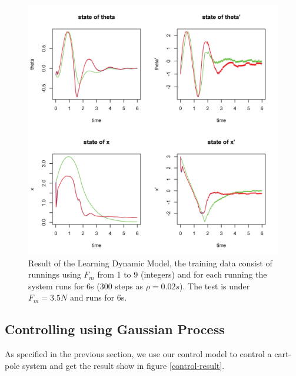 \documentclass[11pt,twoside,a4paper]{article}
\begin{document}
\begin{figure}[!]
\centering
\includegraphics[width=14cm]{learning-result3.png}
\caption{Result of the Learning Dynamic Model, the training data
  consist of runnings using $F_m$ from 1 to 9 (integers) and for each
  running the system runs for 6s (300 steps as $\rho = 0.02s$). The
  test is under $F_m = 3.5N$ and runs for 6s.}
\label{learning-result3}
\end{figure}


\subsection{Controlling using Gaussian Process}

As specified in the previous section, we use our control model to
control a cart-pole system and get the result show in figure \ref{control-result}.\\
\end{document}
